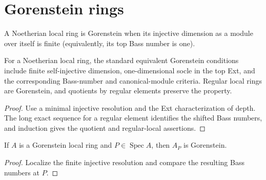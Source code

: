 \section{Gorenstein rings}
\begin{definition}\label{mcrt-def-gorenstein}\uses{}
A Noetherian local ring is Gorenstein when its injective dimension as a module
over itself is finite (equivalently, its top Bass number is one).
\end{definition}
\begin{theorem}\label{mcrt-thm-18-1}
For a Noetherian local ring, the standard equivalent Gorenstein conditions
include finite self-injective dimension, one-dimensional socle in the top Ext,
and the corresponding Bass-number and canonical-module criteria.  Regular local
rings are Gorenstein, and quotients by regular elements preserve the property.
\end{theorem}
\begin{proof}
Use a minimal injective resolution and the Ext characterization of depth.  The
long exact sequence for a regular element identifies the shifted Bass numbers,
and induction gives the quotient and regular-local assertions.
\end{proof}

\begin{theorem}\label{mcrt-thm-18-2}\notready
If $A$ is a Gorenstein local ring and $P\in\operatorname{Spec}A$, then $A_P$
is Gorenstein.
\end{theorem}
\begin{proof}
Localize the finite injective resolution and compare the resulting Bass numbers
at $P$.
\end{proof}
